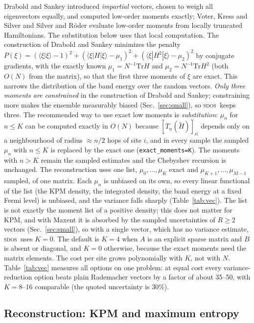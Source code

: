 \documentclass[reprint,nofootinbib,superscriptaddress,amsmath,amssymb,aps,prb,floatfix]{revtex4-2}
\newcommand{\sdos}{\textsc{sdos}}
\newcommand{\Tr}{\mathrm{Tr}}
\begin{document}
Drabold and Sankey \cite{drabold1993} introduced \emph{impartial} vectors, chosen to weigh all eigenvectors equally, and computed low-order moments exactly; Voter, Kress and Silver \cite{voter1996} and Silver and R\"oder \cite{silver1997} evaluate low-order moments from locally truncated Hamiltonians. The substitution below uses that local computation.
The construction of Drabold and Sankey minimizes the penalty $P(\xi)=(\langle\xi|\xi\rangle-1)^2+(\langle\xi|H|\xi\rangle-\mu_1)^2+(\langle\xi|H^2|\xi\rangle-\mu_2)^2$ by conjugate gradients, with the exactly known $\mu_1=N^{-1}\Tr H$ and $\mu_2=N^{-1}\Tr H^2$ (both $O(N)$ from the matrix), so that the first three moments of $\xi$ are exact. This narrows the distribution of the band energy over the random vectors.
\emph{Only three moments are constrained} in the construction of Drabold and Sankey; constraining more makes the ensemble measurably biased (Sec.~\ref{sec:small}), so \sdos\ keeps three.
The recommended way to use exact low moments is \emph{substitution}: $\mu_n$ for $n\le K$ can be computed exactly in $O(N)$ because $[T_n(\tilde H)]_{ii}$ depends only on a neighbourhood of radius $\approx n/2$ hops of site $i$, and in every sample the sampled $\mu_n$ with $n\le K$ is replaced by the exact one (\texttt{exact\_moments=K}). The moments with $n>K$ remain the sampled estimates and the Chebyshev recursion is unchanged. The reconstruction uses one list, $\mu_0,\dots,\mu_K$ exact and $\mu_{K+1},\dots,\mu_{M-1}$ sampled, of one matrix.
Each $\mu_n$ is unbiased on its own, so every linear functional of the list (the KPM density, the integrated density, the band energy at a fixed Fermi level) is unbiased, and the variance falls sharply (Table~\ref{tab:vec}). The list is not exactly the moment list of a positive density; this does not matter for KPM, and with Maxent it is absorbed by the sampled uncertainties of $R\ge2$ vectors (Sec.~\ref{sec:small}), so with a single vector, which has no variance estimate, \sdos\ uses $K=0$.
The default is $K=4$ when $A$ is an explicit sparse matrix and $B$ is absent or diagonal, and $K=0$ otherwise, because the exact moments need the matrix elements. The cost per site grows polynomially with $K$, not with $N$.
Table~\ref{tab:vec} measures all options on one problem: at equal cost every variance-reduction option beats plain Rademacher vectors by a factor of about 35--50, with $K=8$--16 comparable (the quoted uncertainty is 30\%).



\subsection{Reconstruction: KPM and maximum entropy}
\label{sec:recon}
\end{document}
